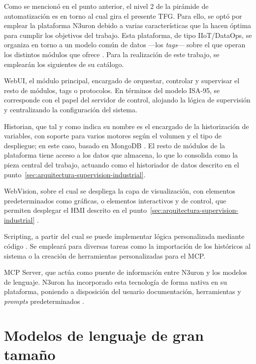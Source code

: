 Como se mencionó en el punto anterior, el nivel 2 de la pirámide de automatización es en
torno al cual gira el presente TFG. Para ello, se optó por emplear la plataforma N3uron
debido a varias características que la hacen óptima para cumplir los objetivos del
trabajo. Esta plataforma, de tipo IIoT/DataOps, se organiza en torno a un modelo común
de datos —los \emph{tags}— sobre el que operan los distintos módulos que ofrece
\cite{n3uron-platform-intro}. Para la realización de este trabajo, se emplearán los
siguientes de su catálogo.

WebUI, el módulo principal, encargado de orquestar, controlar y supervisar el resto de
módulos, tags o protocolos. En términos del modelo ISA-95, se corresponde con el papel
del servidor de control, alojando la lógica de supervisión y centralizando la
configuración del sistema.

Historian, que tal y como indica su nombre es el encargado de la historización de
variables, con soporte para varios motores según el volumen y el tipo de despliegue; en
este caso, basado en MongoDB \cite{n3uron-historian-intro}. El resto de módulos de la
plataforma tiene acceso a los datos que almacena, lo que lo consolida como la pieza
central del trabajo, actuando como el historiador de datos descrito en el
punto~\ref{sec:arquitectura-supervision-industrial}.

WebVision, sobre el cual se despliega la capa de visualización, con elementos
predeterminados como gráficas, o elementos interactivos y de control, que permiten
desplegar el HMI descrito en el punto~\ref{sec:arquitectura-supervision-industrial}
\cite{n3uron-webvision}.

Scripting, a partir del cual se puede implementar lógica personalizada mediante código
\cite{n3uron-scripting}. Se empleará para diversas tareas como la importación de los
históricos al sistema o la creación de herramientas personalizadas para el MCP.

MCP Server, que actúa como puente de información entre N3uron y los modelos de
lenguaje. N3uron ha incorporado esta tecnología de forma nativa en su plataforma,
poniendo a disposición del usuario documentación, herramientas y \emph{prompts}
predeterminados \cite{n3uron-mcp-server}.

\section{Modelos de lenguaje de gran tamaño}
\label{sec:modelos-lenguaje}


